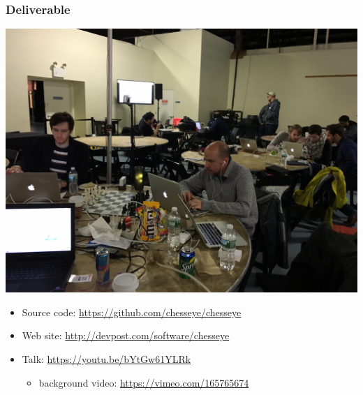 \documentclass[t]{beamer}
\begin{document}
\begin{frame}[fragile]
\frametitle{Deliverable}

\begin{center}
  \includegraphics[scale=0.1]{figures/photo-deliverable-origin}
\end{center}

\begin{itemize}
\item Source code: \url{https://github.com/chesseye/chesseye}
  \medskip
\item Web site: \url{http://devpost.com/software/chesseye}
  \medskip
\item Talk: \url{https://youtu.be/bYtGw61YLRk}
  \begin{itemize}
  \item background video: \url{https://vimeo.com/165765674}
  \end{itemize}
\end{itemize}


\end{frame}




\end{document}
